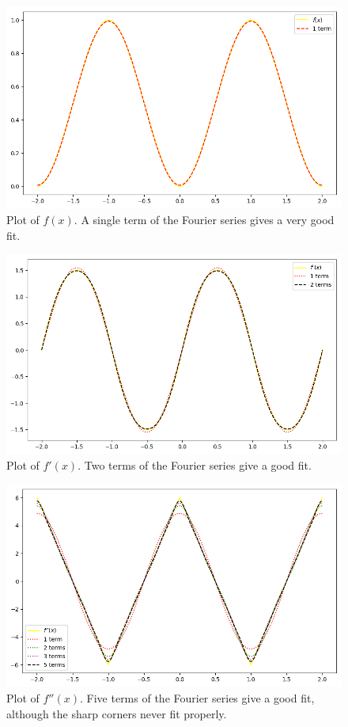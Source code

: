 \documentclass[10pt]{article}
\begin{document}
        \begin{figure}
                \centering        
                \includegraphics[width=\textwidth]{./7_f.png}
                \caption{Plot of $f(x)$. A single term of the Fourier series gives a very good fit.}              
        \end{figure}
        \begin{figure}
                \centering        
                \includegraphics[width=\textwidth]{./7_f1.png}
                \caption{Plot of $f'(x)$. Two terms of the Fourier series give a good fit.}              
        \end{figure}
        \begin{figure}
                \centering        
                \includegraphics[width=\textwidth]{./7_f2.png}
                \caption{Plot of $f''(x)$. Five terms of the Fourier series give a good fit, although the sharp corners never fit properly.}              
        \end{figure}
\end{document}
